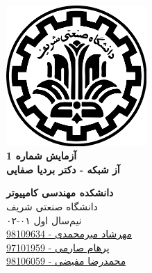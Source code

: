 \documentclass{article}
\begin{document}
\begin{titlepage}
	\begin{center}
		\vspace{0.2cm}
		
		\includegraphics[width=0.4\textwidth]{sharif.png}\\
		\vspace{0.2cm}
		\textbf{ \Huge{آزمایش شماره 1}}\\
		\vspace{0.25cm}
		\textbf{ \Large{آز شبکه - دکتر بردیا صفایی}}
		\vspace{0.2cm}
		
		
		\large \textbf{دانشکده مهندسی کامپیوتر}\\\vspace{0.1cm}
		\large   دانشگاه صنعتی شریف\\\vspace{0.2cm}
		\large   ﻧﯿﻢ‌سال اول ۰۱-۰۲ \\\vspace{0.10cm}
		\large{\href{mailto:mehrshad.mirmohammadi@gmail.com}{مهرشاد میرمحمدی - 98109634}}\\
		\large{\href{mailto:parhaamsaremi@gmail.com}{پرهام صارمی - 97101959}}\\
		\large{\href{mailto:mofayezi.m@gmail.com}{محمدرضا مفیضی - 98106059}}\\
	\end{center}
\end{titlepage}

\newpage

\pagestyle{fancy}
\fancyhf{}
\fancyfoot{}
\setlength{\headheight}{59pt}
\cfoot{\thepage}
\end{document}
